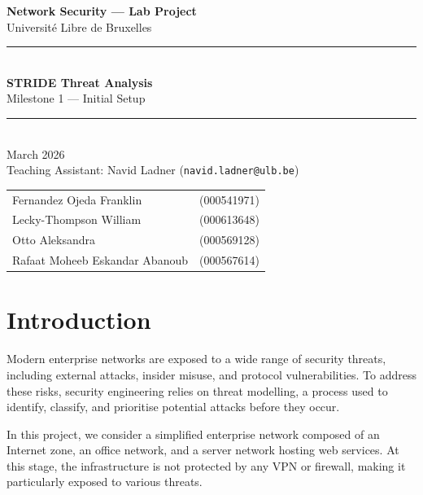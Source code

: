 \documentclass[a4paper,12pt]{article}
\begin{document}

\begin{titlepage}
  \centering
  \vspace*{2cm}
  {\LARGE\textbf{Network Security --- Lab Project}}\\[0.5em]
  {\large Université Libre de Bruxelles}\\[2em]
  \rule{\linewidth}{0.4pt}\\[0.8em]
  {\huge\textbf{STRIDE Threat Analysis}}\\[0.4em]
  {\Large Milestone 1 --- Initial Setup}\\[0.4em]
  \rule{\linewidth}{0.4pt}\\[2em]
  {\large March 2026}\\[1em]
  {\normalsize Teaching Assistant: Navid Ladner
    (\texttt{navid.ladner@ulb.be})}\\[2em]
  \begin{tabular}{ll}
    Fernandez Ojeda Franklin   & (000541971) \\[0.4em]
    Lecky-Thompson William     & (000613648) \\[0.4em]
    Otto Aleksandra            & (000569128) \\[0.4em]
    Rafaat Moheeb Eskandar Abanoub & (000567614) \\
  \end{tabular}
  \vfill
\end{titlepage}

\section*{Introduction}

Modern enterprise networks are exposed to a wide range of security threats, including external attacks, insider misuse, and protocol vulnerabilities. To address these risks, security engineering relies on threat modelling, a process used to identify, classify, and prioritise potential attacks before they occur.

In this project, we consider a simplified enterprise network composed of an Internet zone, an office network, and a server network hosting web services. At this stage, the infrastructure is not protected by any VPN or firewall, making it particularly exposed to various threats.
\end{document}
